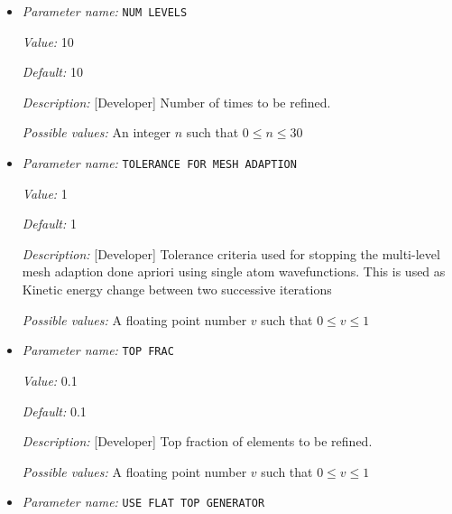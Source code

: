 \begin{itemize}
{\it Possible values:} A floating point number $v$ such that $0 \leq v \leq 10$
\item {\it Parameter name:} {\tt NUM LEVELS}
\label{parameters:Finite element mesh parameters/Auto mesh generation parameters/NUM LEVELS}
\label{parameters:Finite_20element_20mesh_20parameters/Auto_20mesh_20generation_20parameters/NUM_20LEVELS}


{\it Value:} 10


{\it Default:} 10


{\it Description:} [Developer] Number of times to be refined.


{\it Possible values:} An integer $n$ such that $0\leq n \leq 30$
\item {\it Parameter name:} {\tt TOLERANCE FOR MESH ADAPTION}
\label{parameters:Finite element mesh parameters/Auto mesh generation parameters/TOLERANCE FOR MESH ADAPTION}
\label{parameters:Finite_20element_20mesh_20parameters/Auto_20mesh_20generation_20parameters/TOLERANCE_20FOR_20MESH_20ADAPTION}


{\it Value:} 1


{\it Default:} 1


{\it Description:} [Developer] Tolerance criteria used for stopping the multi-level mesh adaption done apriori using single atom wavefunctions. This is used as Kinetic energy change between two successive iterations


{\it Possible values:} A floating point number $v$ such that $0 \leq v \leq 1$
\item {\it Parameter name:} {\tt TOP FRAC}
\label{parameters:Finite element mesh parameters/Auto mesh generation parameters/TOP FRAC}
\label{parameters:Finite_20element_20mesh_20parameters/Auto_20mesh_20generation_20parameters/TOP_20FRAC}


{\it Value:} 0.1


{\it Default:} 0.1


{\it Description:} [Developer] Top fraction of elements to be refined.


{\it Possible values:} A floating point number $v$ such that $0 \leq v \leq 1$
\item {\it Parameter name:} {\tt USE FLAT TOP GENERATOR}
\label{parameters:Finite element mesh parameters/Auto mesh generation parameters/USE FLAT TOP GENERATOR}
\label{parameters:Finite_20element_20mesh_20parameters/Auto_20mesh_20generation_20parameters/USE_20FLAT_20TOP_20GENERATOR}



\end{itemize}
